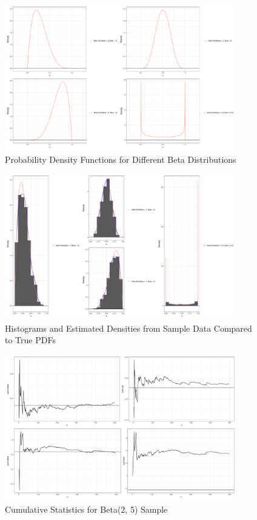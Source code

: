 \documentclass{article}\usepackage[]{graphicx}\usepackage[]{xcolor}
\begin{document}
\begin{figure}[h]
\centering
\includegraphics[width=0.9\textwidth]{beta_distributions.pdf}
\caption{Probability Density Functions for Different Beta Distributions}
\end{figure}

\begin{figure}[h]
\centering
\includegraphics[width=0.9\textwidth]{sample_beta_distributions.pdf}
\caption{Histograms and Estimated Densities from Sample Data Compared to True PDFs}
\end{figure}

\begin{figure}[h]
\centering
\includegraphics[width=0.9\textwidth]{cum_stats_plots.pdf}
\caption{Cumulative Statistics for Beta(2, 5) Sample}
\end{figure}
\end{document}
